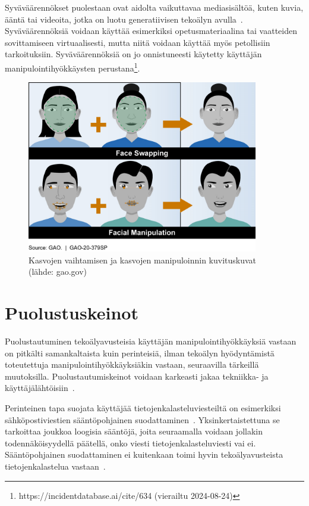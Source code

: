 \begin{otherlanguage}{finnish}
Syväväärennökset puolestaan ovat aidolta vaikuttavaa mediasisältöä, kuten kuvia, ääntä tai videoita, jotka on luotu generatiivisen tekoälyn avulla~\citep{mirsky_Creation_Detection_Deepfakes_2021}. Syväväärennöksiä voidaan käyttää esimerkiksi opetusmateriaalina tai vaatteiden sovittamiseen virtuaalisesti, mutta niitä voidaan käyttää myös petollisiin tarkoituksiin. Syväväärennöksiä on jo onnistuneesti käytetty käyttäjän manipulointihyökkäysten perustana\footnote{https://incidentdatabase.ai/cite/634 (vierailtu 2024-08-24)}.

\begin{figure}[ht]  
    \centering  
    \includegraphics[width=0.9\textwidth]{images/704754.png}  
    \caption{Kasvojen vaihtamisen ja kasvojen manipuloinnin kuvituskuvat (lähde: gao.gov)}  
    \label{figure:deepfakes_fin}  
\end{figure}  

\section*{Puolustuskeinot}

Puolustautuminen tekoälyavusteisia käyttäjän manipulointihyökkäyksiä vastaan on pitkälti samankaltaista kuin perinteisiä, ilman tekoälyn hyödyntämistä toteutettuja manipulointihyökkäyksiäkin vastaan, seuraavilla tärkeillä muutoksilla. Puolustautumiskeinot voidaan karkeasti jakaa tekniikka- ja käyttäjälähtöisiin~\citep{tsinganos_Towards_Automated_Recognition_Chat_SE_Enterprise_2018}.


Perinteinen tapa suojata käyttäjää tietojenkalasteluviesteiltä on esimerkiksi sähköpostiviestien sääntöpohjainen suodattaminen~\citep{mirsky_Threat_Offensive_AI_Organizations_2023}. Yksinkertaistettuna se tarkoittaa joukkoa loogisia sääntöjä, joita seuraamalla voidaan jollakin todennäköisyydellä päätellä, onko viesti tietojenkalasteluviesti vai ei. Sääntöpohjainen suodattaminen ei kuitenkaan toimi hyvin tekoälyavusteista tietojenkalastelua vastaan~\citep{fakhouri_AI_Driven_Solutions_SE_Attacks_2024}.


\end{otherlanguage}
